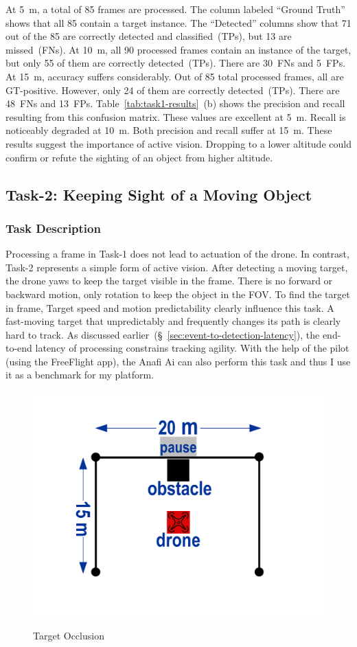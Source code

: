 At 5~m, a total of 85 frames are processed.  The column labeled
``Ground Truth'' shows that all 85 contain a target instance.  The
``Detected'' columns show that 71 out of the 85 are correctly detected
and classified~(TPs), but 13 are missed~(FNs).  At 10~m, all 90
processed frames contain an instance of the target, but only 55 of
them are correctly detected~(TPs).  There are 30~FNs and 5~FPs.  At
15~m, accuracy suffers considerably.  Out of 85 total processed
frames, all are GT-positive.  However, only 24 of them are correctly
detected~(TPs).  There are 48~FNs and 13~FPs.
Table~\ref{tab:task1-results}~(b) shows the precision and recall
resulting from this confusion matrix.  These values are excellent at
5~m.  Recall is noticeably degraded at 10~m.  Both precision and
recall suffer at 15~m.  These results suggest the importance of active
vision. Dropping to a lower altitude could confirm
or refute the sighting of an object from higher altitude. 

\subsection{Task-2: Keeping Sight of  a Moving Object}
\label{sec:task2}

\subsubsection{Task Description}
\label{sec:task2-desc}

Processing a frame in Task-1 does not lead to actuation of the drone.
In contrast, Task-2 represents a simple form of active vision. After
detecting a moving target, the drone yaws to keep the target visible
in the frame. There is no forward or backward motion, only rotation to
keep the object in the FOV. To find the target in frame,  Target speed and motion predictability
clearly influence this task.  A fast-moving target that unpredictably
and frequently changes its path is clearly hard to track.  As
discussed earlier~(\S~\ref{sec:event-to-detection-latency}), the end-to-end latency of
processing constrains tracking agility. With the help of the pilot
(using the FreeFlight app), the Anafi Ai can also perform this task
and thus I use it as a benchmark for my platform.

\begingroup
\setlength{\columnsep}{4pt}
\begin{figure}
\centering
\includegraphics[width=0.4\linewidth]{chapter4/FIGS/fig-yaw-ushape.pdf}\\
\caption{Target Occlusion}
\label{fig:yaw}
\end{figure}

